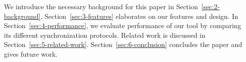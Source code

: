 We introduce the necessary background for this paper in Section~\ref{sec:2-background}.
Section~\ref{sec:3-features} elaborates on our features and design.
In Section~\ref{sec:4-performance}, we evaluate performance of our tool by comparing its different synchronization protocols.
Related work is discussed in Section~\ref{sec:5-related-work}.
Section~\ref{sec:6-conclusion} concludes the paper and gives future work.
